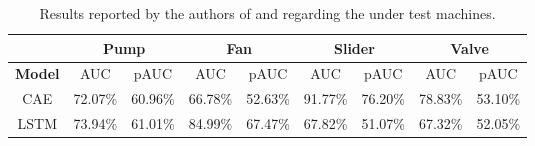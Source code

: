 \begin{table}[ht]
\small
\centering
\begin{tabular}{|c|c|c|c|c|c|c|c|c|} 
\cline{2-9}
\multicolumn{1}{c|}{} & \multicolumn{2}{c|}{\textbf{Pump}} & \multicolumn{2}{c|}{\textbf{Fan}} & \multicolumn{2}{c|}{\textbf{Slider}} & \multicolumn{2}{c|}{\textbf{Valve}} \\ 
\hline
\textbf{Model} & AUC & pAUC & AUC & pAUC & AUC & pAUC & AUC & pAUC \\ 
\hline
CAE \cite{15DeepDenseConvAE} & 72.07\% & 60.96\% & 66.78\% & 52.63\% & 91.77\% & 76.20\% & 78.83\% & 53.10\% \\ 
\hline
LSTM \cite{16LSTMDeepAutoencodersForASDtask} & 73.94\% & 61.01\% & 84.99\% & 67.47\% & 67.82\% & 51.07\% & 67.32\% & 52.05\% \\
\hline
\end{tabular}
\caption{Results reported by the authors of \cite{15DeepDenseConvAE} and \cite{16LSTMDeepAutoencodersForASDtask} regarding the under test machines.}
\label{results_papers_comparison}
\end{table}

